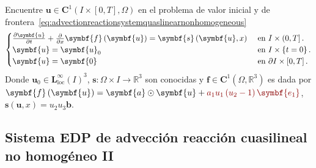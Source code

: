 Encuentre
\begin{math}
	\symbf{u}\in
	\symbf{C}^{1}\left(I\times\left[0,T\right],\Omega\right)
\end{math}
en el problema de valor inicial y de frontera~\eqref{eq:advectionreactionsystemquaslinearnonhomogeneous}
\begin{equation}\label{eq:advectionreactionsystemquaslinearnonhomogeneous}
	\begin{cases}
		\diffp{\symbf{u}}{t}+\diffp{}{x}\symbf{f}\left(\symbf{u}\right)=
		\symbf{s}\left(\symbf{u},x\right) & \text{ en }I\times\left(0,T\right].          \\
		\symbf{u}                                                      =
		\symbf{u}_{0}                     & \text{ en }I\times\left\{t=0\right\}.        \\
		\symbf{u}                                                       =
		\symbf{0}                         & \text{ en }\partial I\times\left[0,T\right].
	\end{cases}
\end{equation}
Donde
\begin{math}
	\symbf{u}_{0}\in
	{\symbf{L}^{\infty}_{\text{loc}}\left(I\right)}^{3}
\end{math},
\begin{math}
	\symbf{s}\colon\Omega\times I\to
	\mathbb{R}^{3}
\end{math}
son conocidas y
\begin{math}
	\symbf{f}\in
	\symbf{C}^{1}\left(\Omega,\mathbb{R}^{3}\right)
\end{math}
es dada por
\begin{math}
	\symbf{f}\left(\symbf{u}\right)=
	\symbf{a}\odot\symbf{u}+
	\mathcolor{DarkRed}{a_{1}u_{1}\left(u_{2}-1\right)\symbf{e_{1}}}
\end{math},
\begin{math}
	\symbf{s}\left(\symbf{u},x\right)=
	u_{2}u_{3}\symbf{b}
\end{math}.

\subsection*{Sistema EDP de advección reacción cuasilineal no homogéneo II}

